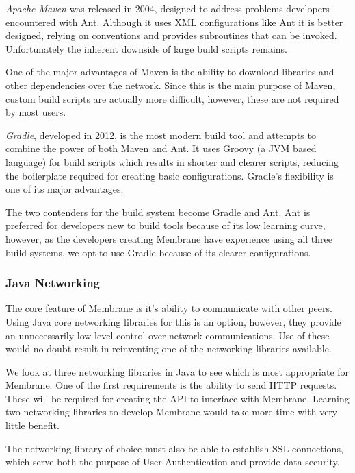 \documentclass[11pt, a4paper, twoside]{report}
\begin{document}
\emph{Apache Maven} was released in 2004, designed to address problems developers encountered with Ant. Although it uses XML configurations like Ant it is better designed, relying on conventions and provides subroutines that can be invoked. Unfortunately the inherent downside of large build scripts remains.

One of the major advantages of Maven is the ability to download libraries and other dependencies over the network. Since this is the main purpose of Maven, custom build scripts are actually more difficult, however, these are not required by most users. \citep{viktor2014buildtools}

\emph{Gradle}, developed in 2012, is the most modern build tool and attempts to combine the power of both Maven and Ant. It uses Groovy (a JVM based language) for build scripts which results in shorter and clearer scripts, reducing the boilerplate required for creating basic configurations. \citep{gradle2017comparison} Gradle's flexibility is one of its major advantages. \citep{casperson2014comparison}

The two contenders for the build system become Gradle and Ant. Ant is preferred for developers new to build tools because of its low learning curve, however, as the developers creating Membrane have experience using all three build systems, we opt to use Gradle because of its clearer configurations.

\subsubsection{Java Networking}

The core feature of Membrane is it's ability to communicate with other peers. Using Java core networking libraries for this is an option, however, they provide an unnecessarily  low-level control over network communications. Use of these would no doubt result in reinventing one of the networking libraries available.

We look at three networking libraries in Java to see which is most appropriate for Membrane. One of the first requirements is the ability to send HTTP requests. These will be required for creating the API to interface with Membrane. Learning two networking libraries to develop Membrane would take more time with very little benefit.

The networking library of choice must also be able to establish SSL connections, which serve both the purpose of User Authentication and provide data security.
\end{document}

